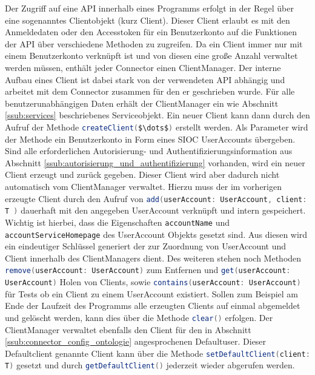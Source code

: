 Der Zugriff auf eine API innerhalb eines Programms erfolgt in der Regel über eine sogenanntes Clientobjekt (kurz Client). Dieser Client erlaubt es mit den Anmeldedaten oder den Accesstoken für ein Benutzerkonto auf die Funktionen der API über verschiedene Methoden zu zugreifen. Da ein Client immer nur mit einem Benutzerkonto verknüpft ist und von diesen eine große Anzahl verwaltet werden müssen, enthält jeder Connector einen ClientManager. Der interne Aufbau eines Client ist dabei stark von der verwendeten API abhängig und arbeitet mit dem Connector zusammen für den er geschrieben wurde. Für alle benutzerunabhängigen Daten erhält der ClientManager ein wie Abschnitt \ref{ssub:services} beschriebenes Serviceobjekt. Ein neuer Client kann dann durch den Aufruf der Methode \lstinline[language=java]{createClient($\dots$)} erstellt werden. Als Parameter wird der Methode ein Benutzerkonto in Form eines SIOC UserAccounts übergeben. Sind alle erforderlichen Autorisierung- und Authentifizierungsinformation aus Abschnitt \ref{ssub:autorisierung_und_authentifizierung} vorhanden, wird ein neuer Client erzeugt und zurück gegeben. Dieser Client wird aber dadurch nicht automatisch vom ClientManager verwaltet. Hierzu muss der im vorherigen erzeugte Client durch den Aufruf von \lstinline[language=java]{add(userAccount: UserAccount, client: T )} dauerhaft mit den angegeben UserAccount verknüpft und intern gespeichert. Wichtig ist hierbei, dass die Eigenschaften \texttt{accountName} und \texttt{accountServiceHomepage} des UserAccount Objekts gesetzt sind. Aus diesen wird ein eindeutiger Schlüssel generiert der zur Zuordnung von UserAccount und Client innerhalb des ClientManagers dient. Des weiteren stehen noch Methoden \lstinline[language=java]{remove(userAccount: UserAccount)} zum Entfernen und \lstinline[language=java]{get(userAccount: UserAccount)} Holen von Clients, sowie \lstinline[language=java]{contains(userAccount: UserAccount)} für Tests ob ein Client zu einem UserAccount existiert. Sollen zum Beispiel am Ende der Laufzeit des Programms alle erzeugten Clients auf einmal abgemeldet und gelöscht werden, kann dies über die Methode \lstinline[language=java]{clear()} erfolgen. Der ClientManager verwaltet ebenfalls den Client für den in Abschnitt \ref{ssub:connector_config_ontologie} angesprochenen Defaultuser. Dieser Defaultclient genannte Client kann über die Methode  \lstinline[language=java]{setDefaultClient(client: T)} gesetzt und durch \lstinline[language=java]{getDefaultClient()} jederzeit wieder abgerufen werden. 


